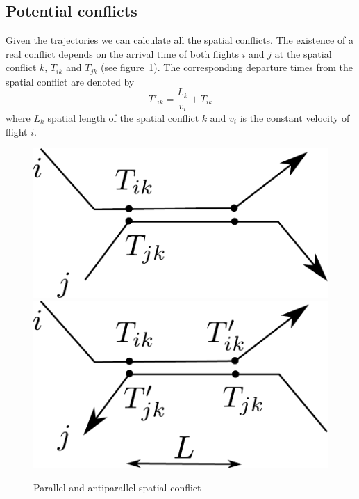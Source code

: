 \documentclass{article}
\begin{document}
\subsection{Potential conflicts}
Given the trajectories we can calculate all the spatial conflicts.
The existence of a real conflict depends on the arrival time of both flights $i$ and $j$ at the spatial conflict $k$, $T_{ik}$ and $T_{jk}$ (see figure~\ref{fig:spatial_conflicts}). 
The corresponding departure times from the spatial conflict are denoted by 
\begin{equation*}
    T'_{ik} = \frac{L_k}{v_i} + T_{ik}
\end{equation*}
where $L_k$ spatial length of the spatial conflict $k$ and $v_i$ is the constant velocity of flight $i$.
\begin{figure}[htpb]
    \centering
    \includegraphics[width=0.3\linewidth]{pics/spatial_conflict_parallel.pdf}
    \hspace{1cm}
    \includegraphics[width=0.3\linewidth]{pics/spatial_conflict_anti_parallel.pdf}
    \caption{Parallel and antiparallel spatial conflict}
    \label{fig:spatial_conflicts}
\end{figure}
\end{document}
